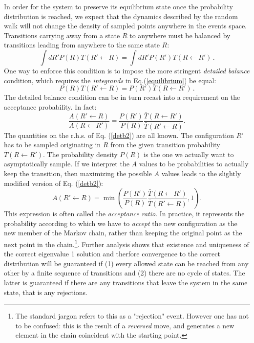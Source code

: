 In order for the system to preserve its equilibrium state once the probability
distribution is reached, we expect that the dynamics described by the random walk will not change the density of sampled points anywhere in the events space.  Transitions carrying away from a state $R$ to anywhere must be balanced by transitions leading from anywhere to the same state $R$:
\begin{equation}
\label{equilibrium}
\int dR' P(R)T(R'\leftarrow R)= \int dR' P(R')T(R\leftarrow R') \,.
\end{equation}
One way to enforce this condition is to impose the more
stringent {\it detailed balance} condition, which requires the {\it integrands} in  Eq.(\ref{equilibrium}) be equal:
\begin{equation}
P(R)T(R'\leftarrow R)=P(R')T(R\leftarrow R') \,.
\end{equation}
The detailed balance condition can be in turn recast into a requirement on the acceptance probability. In fact:
\begin{equation}
\frac{A(R'\leftarrow R)}{A(R\leftarrow R')}=\frac{P(R')}{P(R)}\frac{\bar{T}(R\leftarrow R')}{\bar{T}(R'\leftarrow R)}.
\label{detb2}
\end{equation} 
The quantities on the r.h.s. of Eq. (\ref{detb2}) are all known. The configuration $R'$ has to be sampled originating in $R$ from the given transition probability $\bar{T}(R\leftarrow R')$. The probability density $P(R)$ is the one we actually want to asymptotically sample. 
If we interpret the $A$ values to be probabilities to actually keep the transition, then maximizing the possible $A$ values leads to the slightly modified version of Eq. (\ref{detb2}):
\begin{equation}
A(R'\leftarrow R)=\min\left(\frac{P(R')}{P(R)}\frac{\bar{T}(R\leftarrow R')}{\bar{T}(R'\leftarrow R)},1\right).
\label{detb2}
\end{equation} 
This expression is often called the {\it acceptance ratio}. In practice, it represents the probability according
to which we have to {\it accept} the new configuration as the new member of the Markov chain, rather than
keeping the original point as the next point in the chain.\footnote{The standard jargon refers to this as a "rejection" event. However one has not to be confused: this is the result of a {\it reversed} move, and generates a new element in the chain coincident with the starting point.}.
Further analysis shows that existence and uniqueness of the correct eigenvalue
1 solution and therfore convergence to the correct distribution
will be guaranteed if (1) every allowed state can be reached
from any other by a finite sequence of transitions and (2)
there are no cycle of states. The latter is guaranteed if there are
any transitions that leave the system in the same state, that is any rejections.

